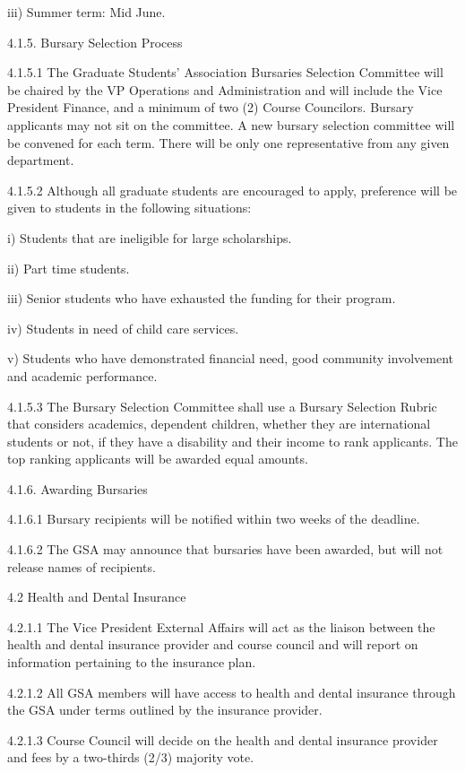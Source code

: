  iii) Summer term: Mid June. 
 
 
 
 4.1.5. Bursary Selection Process 
 
 4.1.5.1 The Graduate Students' Association Bursaries Selection Committee will be chaired by the VP Operations and Administration and will include the Vice President Finance, and a minimum of two (2) Course Councilors. Bursary applicants may not sit on the committee. A new bursary selection committee will be convened for each term. There will be only one representative from any given department. 
 
 4.1.5.2 Although all graduate students are encouraged to apply, preference will be given to students in the following situations: 
 
 i) Students that are ineligible for large scholarships. 
 
 ii) Part time students. 
 
 iii) Senior students who have exhausted the funding for their program. 
 
 iv) Students in need of child care services. 
 
 v) Students who have demonstrated financial need, good community involvement and academic performance. 
 
 4.1.5.3 The Bursary Selection Committee shall use a Bursary Selection Rubric that considers academics, dependent children, whether they are international students or not, if they have a disability and their income to rank applicants. The top ranking applicants will be awarded equal amounts. 
 
 4.1.6. Awarding Bursaries 
 
 4.1.6.1 Bursary recipients will be notified within two weeks of the deadline. 
 
 4.1.6.2 The GSA may announce that bursaries have been awarded, but will not release names of recipients. 
 
 4.2 Health and Dental Insurance 
 
 4.2.1.1 The Vice President External Affairs will act as the liaison between the health and dental insurance provider and course council and will report on information pertaining to the insurance plan. 
 
 4.2.1.2 All GSA members will have access to health and dental insurance through the GSA under terms outlined by the insurance provider. 
 
 4.2.1.3 Course Council will decide on the health and dental insurance provider and fees by a two-thirds (2/3) majority vote. 
 
